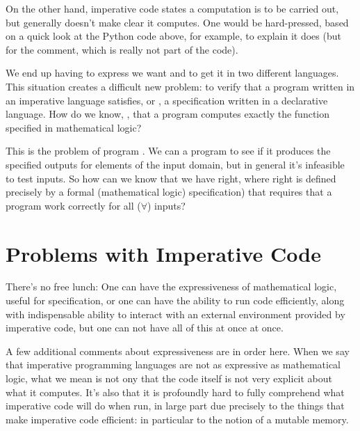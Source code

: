 \documentclass[letterpaper,10pt,english]{sphinxmanual}
\begin{document}
On the other hand, imperative code states  a computation is to be
carried out, but generally doesn’t make clear  it computes. One
would be hard-pressed, based on a quick look at the Python code above,
for example, to explain  it does (but for the comment, which is
really not part of the code).

We end up having to express  we want and  to get it in two
different languages. This situation creates a difficult new problem:
to verify that a program written in an imperative language satisfies,
or , a specification written in a declarative language.  How
do we know, , that a program computes exactly the function
specified in mathematical logic?

This is the problem of program . We can  a program
to see if it produces the specified outputs for  elements of the
input domain, but in general it’s infeasible to test  inputs. So
how can we know that we have  right, where right is
defined precisely by a formal (mathematical logic) specification) that
requires that a program work correctly for all (\(\forall\)) inputs?


\chapter{Problems with Imperative Code}
\label{\detokenize{03-problems-with-imperative-code::doc}}\label{\detokenize{03-problems-with-imperative-code:problems-with-imperative-code}}
There’s no free lunch: One can have the expressiveness of mathematical
logic, useful for specification, or one can have the ability to run
code efficiently, along with indispensable ability to interact with an
external environment provided by imperative code, but one can not have
all of this at once at once.

A few additional comments about expressiveness are in order here. When
we say that imperative programming languages are not as expressive as
mathematical logic, what we mean is not ony that the code itself is not
very explicit about what it computes. It’s also that it is profoundly
hard to fully comprehend what imperative code will do when run, in large
part due precisely to the things that make imperative code efficient: in
particular to the notion of a mutable memory.
\end{document}
